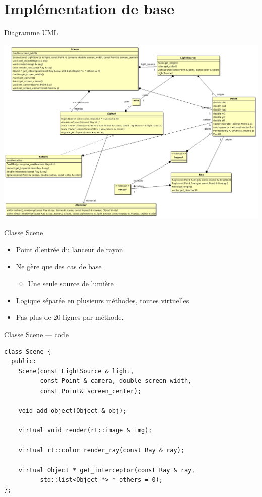 \documentclass{beamer}
\begin{document}
\section{Implémentation de base}
\begin{frame}{Diagramme UML}
    \begin{center}
        \includegraphics[scale=0.2]{img/uml.png}
    \end{center}
\end{frame}

\begin{frame}{Classe Scene}
    \begin{itemize}
        \item Point d'entrée du lanceur de rayon
        \item Ne gère que des cas de base
            \begin{itemize}
                \item Une seule source de lumière
            \end{itemize}
        \item Logique séparée en plusieurs méthodes, toutes virtuelles
        \item Pas plus de 20 lignes par méthode.
    \end{itemize}
\end{frame}

\begin{frame}[fragile]{Classe Scene — code}
    \begin{lstlisting}
class Scene {
  public:
    Scene(const LightSource & light,
          const Point & camera, double screen_width,
          const Point& screen_center);

    void add_object(Object & obj);

    virtual void render(rt::image & img);

    virtual rt::color render_ray(const Ray & ray);

    virtual Object * get_interceptor(const Ray & ray,
          std::list<Object *> * others = 0);
};
    \end{lstlisting}
\end{frame}
\end{document}

